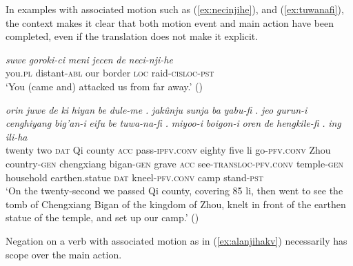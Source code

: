 \documentclass{article}
\newcommand{\ipa}[1]{\textit{{\phon\mbox{#1}}}} %
\begin{document}
In examples with associated motion such as (\ref{ex:necinjihe}), and (\ref{ex:tuwanafi}), the context makes it clear that both motion event and main action have been completed, even if the translation does not make it explicit.
\begin{exe}
\ex \label{ex:necinjihe}
\gll
\ipa{suwe}	\ipa{goroki-ci}	\ipa{meni}	\ipa{jecen}	\ipa{de}	\ipa{neci-nji-he}	 \\
you.\textsc{pl} distant-\textsc{abl} our border \textsc{loc} raid-\textsc{cisloc-pst} \\
\glt ‘You (came and) attacked us from far away.' (\citealt[503;870]{stary83sakda})
\end{exe}

\begin{exe}
\ex \label{ex:tuwanafi}
\gll
\ipa{orin} 	\ipa{juwe} 	\ipa{de} 	\ipa{ki} 	\ipa{hiyan} 	\ipa{be} 	\ipa{dule-me} 	\ipa{.} 	\ipa{jakûnju} 	\ipa{sunja} 	\ipa{ba} 	\ipa{yabu-fi} 	\ipa{.} 	\ipa{jeo} 	\ipa{gurun-i} 	\ipa{cenghiyang} 	\ipa{big’an-i} 	\ipa{eifu} 	\ipa{be} 	\ipa{tuwa-na-fi} 	\ipa{.} 	\ipa{miyoo-i} 	\ipa{boigon-i} 	\ipa{oren} 	\ipa{de} 	\ipa{hengkile-fi} 	\ipa{.} 	\ipa{ing} 	\ipa{ili-ha} \\
twenty two \textsc{dat} Qi county \textsc{acc} pass-\textsc{ipfv.conv} { } eighty five li  go-\textsc{pfv.conv} { } Zhou country-\textsc{gen} chengxiang bigan-\textsc{gen} grave \textsc{acc} see-\textsc{transloc-pfv.conv} { } temple-\textsc{gen} household earthen.statue \textsc{dat} kneel-\textsc{pfv.conv} { } camp stand-\textsc{pst} \\
\glt `On the twenty-second we passed Qi county, covering 85 li, then went to see the tomb of Chengxiang Bigan of the kingdom of Zhou, knelt in front of the earthen statue of the temple, and set up our camp.' (\citealt[83/103]{cosmo06dzengseo})
\end{exe}

Negation on a verb with associated motion as in (\ref{ex:alanjihakv}) necessarily has scope over the main action.
\end{document}
